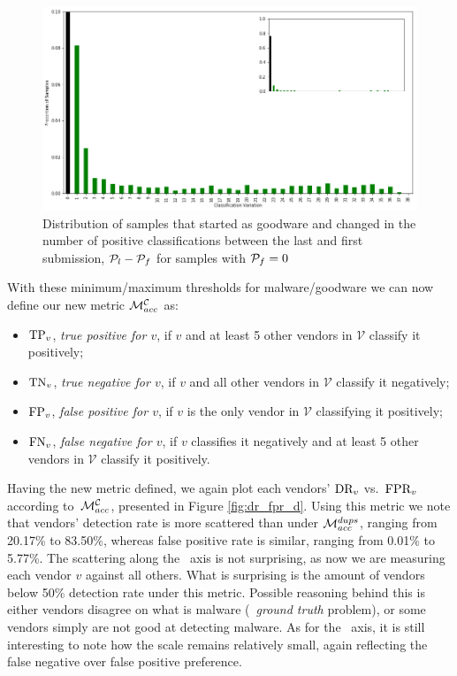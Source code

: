 \begin{figure}[!htb]
	\centering
	\includegraphics[width=\textwidth]{Figures/distribution_clean.png}
	\caption[Distribution of duplicated samples with $\Pf=0$.]{Distribution of samples that started as goodware and changed in the number of positive classifications between the last and first submission, \ie $\mathcal{P}_{l}-\mathcal{P}_{f}$ for samples with $\Pf=0$}
	\label{fig:distribution_clean}
\end{figure}

With these minimum/maximum thresholds for malware/goodware we can now define our new metric $\mathcal{M}_{acc}^{\mathcal{C}}$ as:

\begin{itemize}
	\item $\textrm{TP}_v$, \emph{true positive for $v$}, if $v$ and at least 5 other vendors in $\mathcal{V}$ classify it positively;
	\item $\textrm{TN}_v$, \emph{true negative for $v$}, if $v$ and all other vendors in $\mathcal{V}$ classify it negatively;
	\item $\textrm{FP}_v$, \emph{false positive for $v$}, if $v$ is the only vendor in $\mathcal{V}$ classifying it positively;
	\item $\textrm{FN}_v$, \emph{false negative for $v$}, if $v$ classifies it negatively and at least 5 other vendors in $\mathcal{V}$ classify it positively.
\end{itemize}

Having the new metric defined, we again plot each vendors' $\textrm{DR}_v$ vs.\ $\textrm{FPR}_v$ according to~$\mathcal{M}_{acc}^{\mathcal{C}}$, presented in Figure \ref{fig:dr_fpr_d}.
Using this metric we note that vendors' detection rate is more scattered than under $\mathcal{M}_{acc}^{{dups}}$, ranging from 20.17\% to 83.50\%, whereas false positive rate is similar, ranging from 0.01\% to 5.77\%.
The scattering along the \tpr\ axis is not surprising, as now we are measuring each vendor $v$ against all others.
What is surprising is the amount of vendors below 50\% detection rate under this metric.
Possible reasoning behind this is either vendors disagree on what is malware (\ie\ \textit{ground truth} problem), or some vendors simply are not good at detecting malware.
As for the \fpr\ axis, it is still interesting to note how the scale remains relatively small, again reflecting the false negative over false positive preference.

